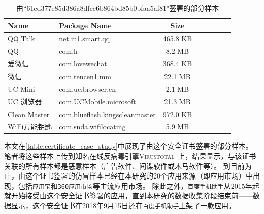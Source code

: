 \begin{table}[htbp]
    \renewcommand{\arraystretch}{1}
    \small
    \centering
    \caption{由``61ed377e85d386a8dfee6b864bd85b0bfaa5af81"签署的部分样本}
    \vspace{1mm}
    \begin{tabular}{l l c c c c c c}
        \toprule
        {\bf Name} & {\bf Package Name} & {\bf Size} \\
        \midrule
        QQ Talk  & net.in1.smart.qq & 465.8 KB \\
        QQ  & com.h & 8.2 MB \\
        爱微信  & com.lovewechat & 368.4 KB \\
        微信  & com.tencen1.mm & 22.1 MB \\
        UC Mini  & com.uc.browser.en & 2.1 MB \\
        UC 浏览器  & com.UCMobile.microsoft & 21.3 MB \\
        Clean Master  & com.blueflash.kingscleanmaster & 972.0 KB \\
        WiFi万能钥匙  & com.snda.wifilocating & 5.9 MB \\
        \bottomrule
    \end{tabular}
    \label{table:certificate_case_study}
\end{table}

本文在\autoref{table:certificate_case_study}中展现了由这个安全证书签署的部分样本。
笔者将这些样本上传到知名在线反病毒引擎\textsc{Virustotal}~\cite{virustotal}上，结果显示，与该证书关联的所有样本都是恶意样本（广告软件、间谍软件或木马软件等）。
到目前为止，由这个证书签署的仿冒样本已经在本研究的20个应用来源（即应用市场）中出现，包括\texttt{应用宝}和\texttt{360应用市场}等主流应用市场。
除此之外，\texttt{百度手机助手}从2015年起就开始接受由这个安全证书签署的应用，直到本研究的数据收集阶段结束前——数据显示，这个安全证书在2018年9月15日还在\texttt{百度手机助手}上架了一款应用。

